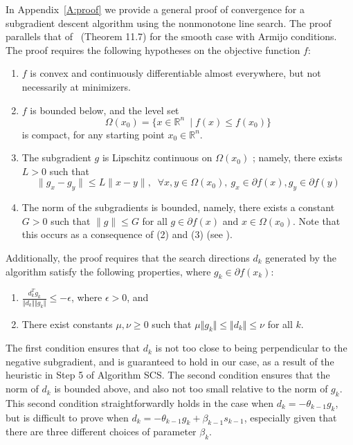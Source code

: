 \documentclass[]{interact}
\newcommand{\Real}{\mathbb{R}}
\theoremstyle{plain}%
\theoremstyle{definition}
\theoremstyle{remark}
\begin{document}
In Appendix~\ref{A:proof} we provide a general proof of convergence for a subgradient descent algorithm using the nonmonotone line search. The proof parallels that of~\cite{Griva} (Theorem 11.7) for the smooth case with Armijo conditions. The proof requires the following hypotheses on the objective function $f$:
\begin{enumerate}
\item $f$ is convex and continuously differentiable almost everywhere, but not necessarily at minimizers.
\item $f$ is bounded below, and the level set \[\Omega(x_0)=\{x\in \Real^n\ \mid f(x)\leq f(x_0)\}\] is compact, for any starting point $x_0\in \Real^n$. 
\item The subgradient $g$ is Lipschitz continuous on $\Omega(x_0)$ ; namely, there exists $L > 0$ such that
\begin{equation*}\parallel g_x-g_y \parallel \leq L \parallel x-y\parallel, \;\;\forall x,y\in \Omega(x_0),~ g_x \in \partial f(x), g_y \in \partial f(y)
\end{equation*}
\item The norm of the subgradients is bounded, namely, there exists a constant $G>0$ such that $\parallel g \parallel \leq G$ for all $g \in
\partial f(x)$ and $x \in \Omega(x_0)$. Note that this occurs as a consequence of (2) and (3) (see \cite{zzl06}).\end{enumerate}

Additionally, the proof requires that the search directions $d_k$ generated by the algorithm satisfy the following properties, where $g_k \in \partial f(x_k)$:
\begin{enumerate}
\itemsep1em
\item  $\displaystyle \frac{d_k^T g_k}{\Vert d_k \Vert \Vert g_k \Vert} \leq -\epsilon$, where $\epsilon > 0$, and
\item There exist constants $\mu,\nu \geq 0$ such that $\mu \Vert g_k \Vert \leq \Vert d_k \Vert \leq \nu$ for all $k$.
\end{enumerate}
The first condition ensures that $d_k$ is not too close to being perpendicular to the negative subgradient, and is guaranteed to hold in our case, as a result of the heuristic in Step 5 of Algorithm SCS. The second condition ensures that the norm of $d_k$ is bounded above, and also not too small relative to the norm of $g_k$. This second condition straightforwardly holds in the case when $d_k = -\theta_{k-1}g_k$, but is difficult to prove when $d_k = -\theta_{k-1}g_k + \beta_{k-1} s_{k-1}$, especially given that there are three different choices of parameter $\beta_k$. 
\end{document}
